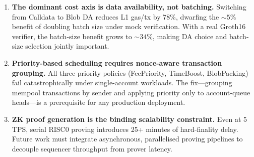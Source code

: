 \begin{enumerate}
  \item \textbf{The dominant cost axis is data availability, not batching.}
    Switching from Calldata to Blob DA reduces L1 gas/tx by 78\%, dwarfing
    the ${\sim}5\%$ benefit of doubling batch size under mock verification.
    With a real Groth16 verifier, the batch-size benefit grows to ${\sim}34\%$,
    making DA choice and batch-size selection jointly important.

  \item \textbf{Priority-based scheduling requires nonce-aware transaction
    grouping.}  All three priority policies (FeePriority, TimeBoost,
    BlobPacking) fail catastrophically under single-account workloads.
    The fix---grouping mempool transactions by sender and applying priority
    only to account-queue heads---is a prerequisite for any production
    deployment.

  \item \textbf{ZK proof generation is the binding scalability constraint.}
    Even at 5\,TPS, serial RISC0 proving introduces 25+ minutes of
    hard-finality delay.  Future work must integrate asynchronous, parallelised
    proving pipelines to decouple sequencer throughput from prover latency.
\end{enumerate}
